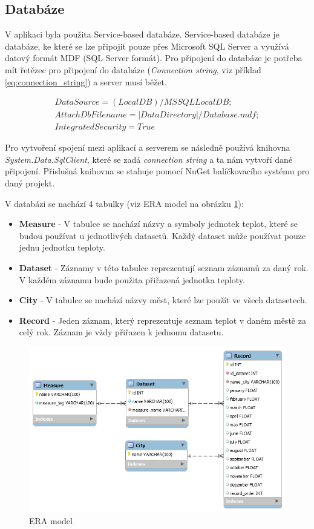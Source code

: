 \documentclass[12pt, a4paper]{article}
\begin{document}
\subsection{Databáze}
V aplikaci byla použita Service-based databáze. Service-based databáze je databáze, ke které se lze připojit pouze přes Microsoft SQL Server a využívá datový formát MDF (SQL Server formát). Pro připojení do databáze je potřeba mít řetězec pro připojení do databáze (\textit{Connection string}, viz příklad \ref{eq:connection_string}) a server musí běžet.

\begin{equation}
\begin{split}
Data Source=(LocalDB)/MSSQLLocalDB; \\
AttachDbFilename=|DataDirectory|/Database.mdf; \\
Integrated Security=True
\end{split}
\label{eq:connection_string} 
\end{equation}

Pro vytvoření spojení mezi aplikací a serverem se následně používá knihovna \textit{System.Data.SqlClient}, které se zadá \textit{connection string} a ta nám vytvoří dané připojení. Přislušná knihovna se stahuje pomocí NuGet balíčkovacího systému pro daný projekt.

V databázi se nachází 4 tabulky (viz ERA model na obrázku \ref{fig:era_model}):
\begin{itemize}
\item \textbf{Measure} - V tabulce se nachází názvy a symboly jednotek teplot, které se budou používat u jednotlivých datasetů. Každý dataset může používat pouze jednu jednotku teploty.
\item \textbf{Dataset} - Záznamy v této tabulce reprezentují seznam záznamů za daný rok. V každém záznamu bude použita přiřazená jednotka teploty.
\item \textbf{City} - V tabulce se nachází názvy měst, které lze použít ve všech datasetech.
\item \textbf{Record} - Jeden záznam, který reprezentuje seznam teplot v daném městě za celý rok. Záznam je vždy přiřazen k jednomu datasetu.
\end{itemize}
\begin{figure}[h!]
	\centering
	\includegraphics[width=12cm]{img/era.png}
	\caption{ERA model}
	\label{fig:era_model}	
\end{figure}
\end{document}
